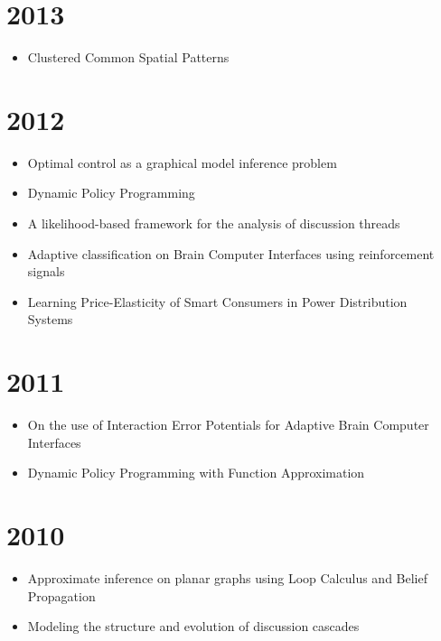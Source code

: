 \documentclass{article}
\begin{document}
\section*{2013}

\begin{itemize}
\item Clustered Common Spatial Patterns~\cite{ccsps}
\end{itemize}

\section*{2012}
\begin{itemize}
\item Optimal control as a graphical model inference problem~\cite{springerlink:10.1007/s10994-012-5278-7}
\item Dynamic Policy Programming~\cite{azar12a}
\item A likelihood-based framework for the analysis of discussion threads~\cite{gomez13www}
\item Adaptive classification on Brain Computer Interfaces using reinforcement signals~\cite{Llera_2012}
\item Learning Price-Elasticity of Smart Consumers in Power Distribution Systems~\cite{gomez2012learning}
\end{itemize}

\section*{2011}

\begin{itemize}
\item On the use of Interaction Error Potentials for Adaptive Brain Computer Interfaces~\cite{Llera_Kappen_2011}
\item Dynamic Policy Programming with Function Approximation~\cite{gheslaghi11}
\end{itemize}

\section*{2010}

\begin{itemize}
\item Approximate inference on planar graphs using Loop Calculus and Belief Propagation~\cite{Gomez:2010:AIP:1756006.1859893}
\item Modeling the structure and evolution of discussion cascades~\cite{Gomez:2011:MSE:1995966.1995992}
\end{itemize}
\end{document}
